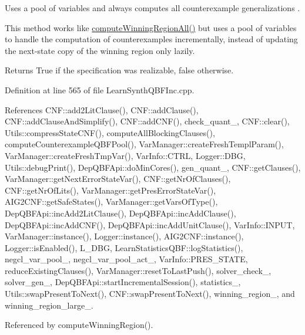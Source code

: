 Uses a pool of variables and always computes all counterexample generalizations . 

This method works like \hyperlink{classLearnSynthQBFInc_a796673a80bbba7c8b4b7b5b9e4c8332a}{compute\-Winning\-Region\-All()} but uses a pool of variables to handle the computation of counterexamples incrementally, instead of updating the next-\/state copy of the winning region only lazily.

\begin{DoxyReturn}{Returns}
True if the specification was realizable, false otherwise. 
\end{DoxyReturn}


Definition at line 565 of file Learn\-Synth\-Q\-B\-F\-Inc.\-cpp.



References C\-N\-F\-::add2\-Lit\-Clause(), C\-N\-F\-::add\-Clause(), C\-N\-F\-::add\-Clause\-And\-Simplify(), C\-N\-F\-::add\-C\-N\-F(), check\-\_\-quant\-\_\-, C\-N\-F\-::clear(), Utils\-::compress\-State\-C\-N\-F(), compute\-All\-Blocking\-Clauses(), compute\-Counterexample\-Q\-B\-F\-Pool(), Var\-Manager\-::create\-Fresh\-Templ\-Param(), Var\-Manager\-::create\-Fresh\-Tmp\-Var(), Var\-Info\-::\-C\-T\-R\-L, Logger\-::\-D\-B\-G, Utils\-::debug\-Print(), Dep\-Q\-B\-F\-Api\-::do\-Min\-Cores(), gen\-\_\-quant\-\_\-, C\-N\-F\-::get\-Clauses(), Var\-Manager\-::get\-Next\-Error\-State\-Var(), C\-N\-F\-::get\-Nr\-Of\-Clauses(), C\-N\-F\-::get\-Nr\-Of\-Lits(), Var\-Manager\-::get\-Pres\-Error\-State\-Var(), A\-I\-G2\-C\-N\-F\-::get\-Safe\-States(), Var\-Manager\-::get\-Vars\-Of\-Type(), Dep\-Q\-B\-F\-Api\-::inc\-Add2\-Lit\-Clause(), Dep\-Q\-B\-F\-Api\-::inc\-Add\-Clause(), Dep\-Q\-B\-F\-Api\-::inc\-Add\-C\-N\-F(), Dep\-Q\-B\-F\-Api\-::inc\-Add\-Unit\-Clause(), Var\-Info\-::\-I\-N\-P\-U\-T, Var\-Manager\-::instance(), Logger\-::instance(), A\-I\-G2\-C\-N\-F\-::instance(), Logger\-::is\-Enabled(), L\-\_\-\-D\-B\-G, Learn\-Statistics\-Q\-B\-F\-::log\-Statistics(), negcl\-\_\-var\-\_\-pool\-\_\-, negcl\-\_\-var\-\_\-pool\-\_\-act\-\_\-, Var\-Info\-::\-P\-R\-E\-S\-\_\-\-S\-T\-A\-T\-E, reduce\-Existing\-Clauses(), Var\-Manager\-::reset\-To\-Last\-Push(), solver\-\_\-check\-\_\-, solver\-\_\-gen\-\_\-, Dep\-Q\-B\-F\-Api\-::start\-Incremental\-Session(), statistics\-\_\-, Utils\-::swap\-Present\-To\-Next(), C\-N\-F\-::swap\-Present\-To\-Next(), winning\-\_\-region\-\_\-, and winning\-\_\-region\-\_\-large\-\_\-.



Referenced by compute\-Winning\-Region().

